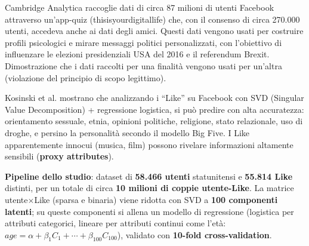 \documentclass[a4paper,11pt]{article}
\begin{document}
\begin{esempio}
Cambridge Analytica raccoglie dati di circa 87 milioni di utenti Facebook attraverso un'app-quiz (thisisyourdigitallife) che, con il consenso di circa 270.000 utenti, accedeva anche ai dati degli amici. Questi dati vengono usati per costruire profili psicologici e mirare messaggi politici personalizzati, con l'obiettivo di influenzare le elezioni presidenziali USA del 2016 e il referendum Brexit. Dimostrazione che i dati raccolti per una finalit\`{a} vengono usati per un'altra (violazione del principio di scopo legittimo).
\end{esempio}

\begin{esempio}
Kosinski et al. mostrano che analizzando i ``Like'' su Facebook con SVD (Singular Value Decomposition) + regressione logistica, si pu\`{o} predire con alta accuratezza: orientamento sessuale, etnia, opinioni politiche, religione, stato relazionale, uso di droghe, e persino la personalit\`{a} secondo il modello Big Five. I Like apparentemente innocui (musica, film) possono rivelare informazioni altamente sensibili (\textbf{proxy attributes}).

\textbf{Pipeline dello studio}: dataset di \textbf{58.466 utenti} statunitensi e \textbf{55.814 Like} distinti, per un totale di circa \textbf{10 milioni di coppie utente-Like}. La matrice utente$\times$Like (sparsa e binaria) viene ridotta con SVD a \textbf{100 componenti latenti}; su queste componenti si allena un modello di regressione (logistica per attributi categorici, lineare per attributi continui come l'et\`{a}: $age = \alpha + \beta_1 C_1 + \cdots + \beta_{100} C_{100}$), validato con \textbf{10-fold cross-validation}.

\begin{center}
\end{center}


\end{esempio}
\end{document}
